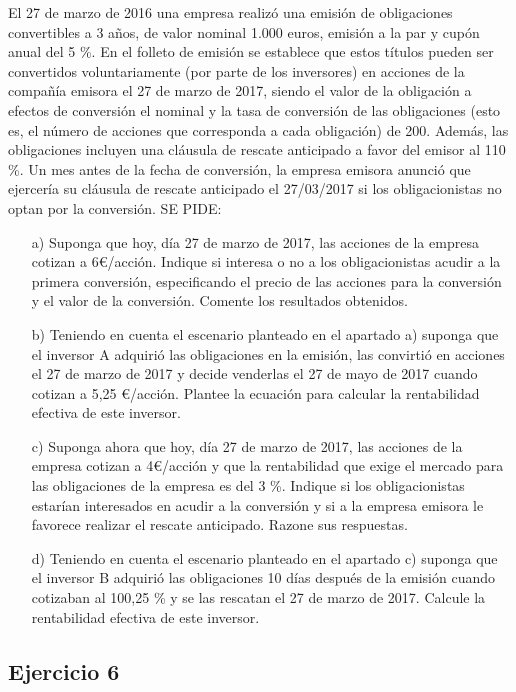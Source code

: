 El 27 de marzo de 2016 una empresa realizó una emisión de obligaciones convertibles a 3 años, de valor nominal 1.000 euros, emisión a la par y cupón anual del 5 \%. En el folleto de emisión se establece que estos títulos pueden ser convertidos voluntariamente (por parte de los inversores) en acciones de la compañía emisora el 27 de marzo de 2017, siendo el valor de la obligación a efectos de conversión el nominal y la tasa de conversión de las obligaciones (esto es, el número de acciones que corresponda a cada obligación) de 200. Además, las obligaciones incluyen una cláusula de rescate anticipado a favor del emisor al 110 \%. Un mes antes de la fecha de conversión, la empresa emisora anunció que ejercería su cláusula de rescate anticipado el 27/03/2017 si los obligacionistas no optan por la conversión. SE PIDE:
\begin{enumerate}
    \item[a)] Suponga que hoy, día 27 de marzo de 2017, las acciones de la empresa cotizan a 6€/acción. Indique si interesa o no a los obligacionistas acudir a la primera conversión, especificando el precio de las acciones para la conversión y el valor de la conversión. Comente los resultados obtenidos.
    \item[b)] Teniendo en cuenta el escenario planteado en el apartado a) suponga que el inversor A adquirió las obligaciones en la emisión, las convirtió en acciones el 27 de marzo de 2017 y decide venderlas el 27 de mayo de 2017 cuando cotizan a 5,25 €/acción. Plantee la ecuación para calcular la rentabilidad efectiva de este inversor.
    \item[c)] Suponga ahora que hoy, día 27 de marzo de 2017, las acciones de la empresa cotizan a 4€/acción y que la rentabilidad que exige el mercado para las obligaciones de la empresa es del 3 \%. Indique si los obligacionistas estarían interesados en acudir a la conversión y si a la empresa emisora le favorece realizar el rescate anticipado. Razone sus respuestas.
    \item[d)] Teniendo en cuenta el escenario planteado en el apartado c) suponga que el inversor B adquirió las obligaciones 10 días después de la emisión cuando cotizaban al 100,25 \% y se las rescatan el 27 de marzo de 2017. Calcule la rentabilidad efectiva de este inversor.
\end{enumerate}

\subsection*{Ejercicio 6}

